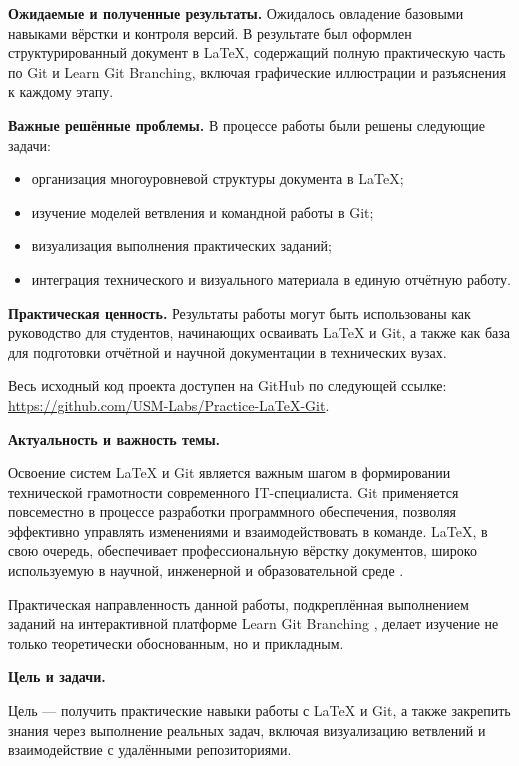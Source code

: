 \documentclass[a4paper,12pt]{report}
\newcommand{\github}{\url{https://github.com/USM-Labs/Practice-LaTeX-Git}}
\begin{document}
\textbf{Ожидаемые и полученные результаты.}
Ожидалось овладение базовыми навыками вёрстки и контроля версий. В результате был оформлен структурированный документ в \LaTeX{}, содержащий полную практическую часть по Git и Learn Git Branching, включая графические иллюстрации и разъяснения к каждому этапу.

\textbf{Важные решённые проблемы.}
В процессе работы были решены следующие задачи:
\begin{itemize}
  \item организация многоуровневой структуры документа в \LaTeX{};
  \item изучение моделей ветвления и командной работы в Git;
  \item визуализация выполнения практических заданий;
  \item интеграция технического и визуального материала в единую отчётную работу.
\end{itemize}

\textbf{Практическая ценность.}
Результаты работы могут быть использованы как руководство для студентов, начинающих осваивать \LaTeX{} и Git, а также как база для подготовки отчётной и научной документации в технических вузах.

Весь исходный код проекта доступен на GitHub по следующей ссылке: \github.


\introChapter

\textbf{Актуальность и важность темы.}

Освоение систем \LaTeX{} и Git \cite{latex_official_doc, progit_book} является важным шагом в формировании технической грамотности современного IT-специалиста. Git применяется повсеместно в процессе разработки программного обеспечения, позволяя эффективно управлять изменениями и взаимодействовать в команде. \LaTeX{}, в свою очередь, обеспечивает профессиональную вёрстку документов, широко используемую в научной, инженерной и образовательной среде \cite{latex_project_site, overleaf_intro}.

Практическая направленность данной работы, подкреплённая выполнением заданий на интерактивной платформе Learn Git Branching \cite{learngitbranching}, делает изучение не только теоретически обоснованным, но и прикладным.

\textbf{Цель и задачи.}

Цель — получить практические навыки работы с \LaTeX{} и Git, а также закрепить знания через выполнение реальных задач, включая визуализацию ветвлений и взаимодействие с удалёнными репозиториями.
\end{document}
